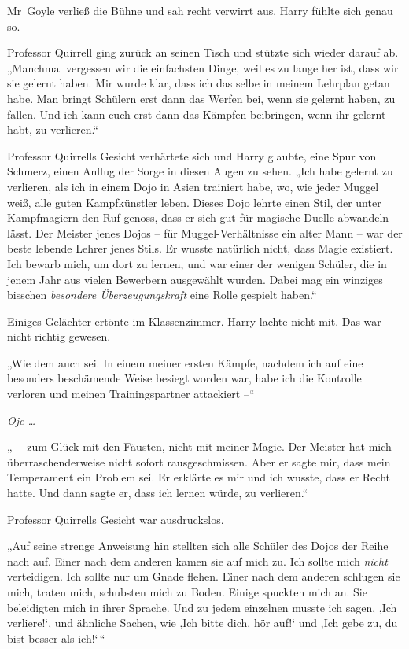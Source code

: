 {Mr~Goyle verließ die Bühne und sah recht verwirrt aus. Harry fühlte sich genau so.

Professor Quirrell ging zurück an seinen Tisch und stützte sich wieder darauf ab. „Manchmal vergessen wir die einfachsten Dinge, weil es zu lange her ist, dass wir sie gelernt haben. Mir wurde klar, dass ich das selbe in meinem Lehrplan getan habe. Man bringt Schülern erst dann das Werfen bei, wenn sie gelernt haben, zu fallen. Und ich kann euch erst dann das Kämpfen beibringen, wenn ihr gelernt habt, zu verlieren.“

Professor Quirrells Gesicht verhärtete sich und Harry glaubte, eine Spur von Schmerz, einen Anflug der Sorge in diesen Augen zu sehen. „Ich habe gelernt zu verlieren, als ich in einem Dojo in Asien trainiert habe, wo, wie jeder Muggel weiß, alle guten Kampfkünstler leben. Dieses Dojo lehrte einen Stil, der unter Kampfmagiern den Ruf genoss, dass er sich gut für magische Duelle abwandeln lässt. Der Meister jenes Dojos -- für Muggel-Verhältnisse ein alter Mann -- war der beste lebende Lehrer jenes Stils. Er wusste natürlich nicht, dass Magie existiert. Ich bewarb mich, um dort zu lernen, und war einer der wenigen Schüler, die in jenem Jahr aus vielen Bewerbern ausgewählt wurden. Dabei mag ein winziges bisschen \emph{besondere Überzeugungskraft} eine Rolle gespielt haben.“

Einiges Gelächter ertönte im Klassenzimmer. Harry lachte nicht mit. Das war nicht richtig gewesen.

„Wie dem auch sei. In einem meiner ersten Kämpfe, nachdem ich auf eine besonders beschämende Weise besiegt worden war, habe ich die Kontrolle verloren und meinen Trainingspartner attackiert --“

\emph{Oje …}

„--- zum Glück mit den Fäusten, nicht mit meiner Magie. Der Meister hat mich überraschenderweise nicht sofort rausgeschmissen. Aber er sagte mir, dass mein Temperament ein Problem sei. Er erklärte es mir und ich wusste, dass er Recht hatte. Und dann sagte er, dass ich lernen würde, zu verlieren.“

Professor Quirrells Gesicht war ausdruckslos.

„Auf seine strenge Anweisung hin stellten sich alle Schüler des Dojos der Reihe nach auf. Einer nach dem anderen kamen sie auf mich zu. Ich sollte mich \emph{nicht} verteidigen. Ich sollte nur um Gnade flehen. Einer nach dem anderen schlugen sie mich, traten mich, schubsten mich zu Boden. Einige spuckten mich an. Sie beleidigten mich in ihrer Sprache. Und zu jedem einzelnen musste ich sagen, ‚Ich verliere!`, und ähnliche Sachen, wie ‚Ich bitte dich, hör auf!` und ‚Ich gebe zu, du bist besser als ich!`\,“

}
